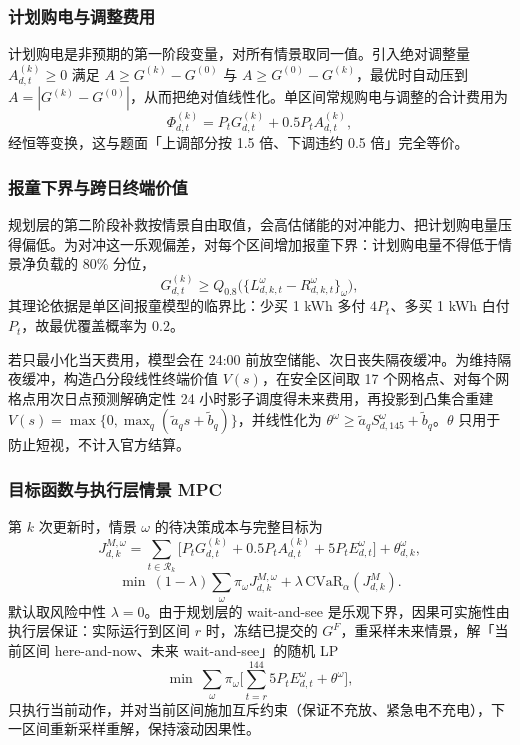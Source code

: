 \subsubsection{计划购电与调整费用}

计划购电是非预期的第一阶段变量，对所有情景取同一值。引入绝对调整量 $A^{(k)}_{d,t}\ge0$ 满足 $A\ge G^{(k)}-G^{(0)}$ 与 $A\ge G^{(0)}-G^{(k)}$，最优时自动压到 $A=|G^{(k)}-G^{(0)}|$，从而把绝对值线性化。单区间常规购电与调整的合计费用为
\begin{equation}
\Phi^{(k)}_{d,t}=P_t G^{(k)}_{d,t}+0.5P_t A^{(k)}_{d,t},\label{eq:adjust3}
\end{equation}
经恒等变换，这与题面「上调部分按 1.5 倍、下调违约 0.5 倍」完全等价。

\subsubsection{报童下界与跨日终端价值}

规划层的第二阶段补救按情景自由取值，会高估储能的对冲能力、把计划购电量压得偏低。为对冲这一乐观偏差，对每个区间增加报童下界：计划购电量不得低于情景净负载的 80\% 分位，
\begin{equation}
G^{(k)}_{d,t}\ge Q_{0.8}\big(\{L^\omega_{d,k,t}-R^\omega_{d,k,t}\}_{\omega}\big),\label{eq:newsvendor3}
\end{equation}
其理论依据是单区间报童模型的临界比：少买 1 kWh 多付 $4P_t$、多买 1 kWh 白付 $P_t$，故最优覆盖概率为 $0.2$。

若只最小化当天费用，模型会在 24:00 前放空储能、次日丧失隔夜缓冲。为维持隔夜缓冲，构造凸分段线性终端价值 $V(s)$，在安全区间取 17 个网格点、对每个网格点用次日点预测解确定性 24 小时影子调度得未来费用，再投影到凸集合重建 $V(s)=\max\{0,\max_q(\widetilde a_q s+\widetilde b_q)\}$，并线性化为 $\theta^\omega\ge\widetilde a_q S^\omega_{d,145}+\widetilde b_q$。$\theta$ 只用于防止短视，不计入官方结算。

\subsubsection{目标函数与执行层情景 MPC}

第 $k$ 次更新时，情景 $\omega$ 的待决策成本与完整目标为
\begin{equation}
J^{M,\omega}_{d,k}=\sum_{t\in\mathcal R_k}\Big[P_t G^{(k)}_{d,t}+0.5P_t A^{(k)}_{d,t}+5P_t E^\omega_{d,t}\Big]+\theta^\omega_{d,k},\label{eq:cost3}
\end{equation}
\begin{equation}
\min\ (1-\lambda)\sum_{\omega}\pi_\omega J^{M,\omega}_{d,k}+\lambda\,\mathrm{CVaR}_\alpha(J^{M}_{d,k}).\label{eq:obj3}
\end{equation}
默认取风险中性 $\lambda=0$。由于规划层的 wait-and-see 是乐观下界，因果可实施性由执行层保证：实际运行到区间 $r$ 时，冻结已提交的 $G^F$，重采样未来情景，解「当前区间 here-and-now、未来 wait-and-see」的随机 LP
\begin{equation}
\min\ \sum_{\omega}\pi_\omega\Big[\sum_{t=r}^{144}5P_t E^\omega_{d,t}+\theta^\omega\Big],\label{eq:mpc3}
\end{equation}
只执行当前动作，并对当前区间施加互斥约束（保证不充放、紧急电不充电），下一区间重新采样重解，保持滚动因果性。

